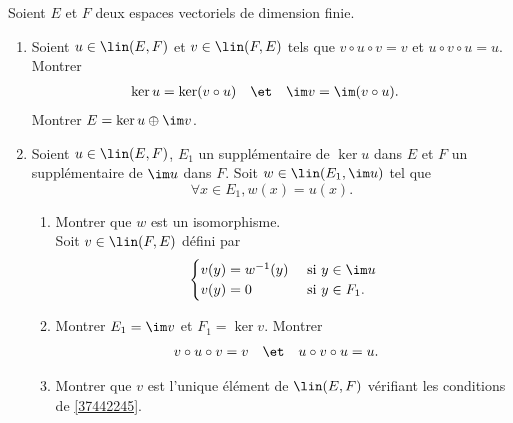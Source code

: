 \begin{enonce}
\begin{exercise}[ID={RMS 122 E250},subtitle={},tags={}]
Soient $E$ et $F$ deux espaces vectoriels de dimension finie.
\begin{enumerate}
  \item
	Soient $u\in\lin(E,F)$ et $v\in\lin(F,E)$ tels que $v\circ u\circ v=v$ et $u\circ v\circ u=u$. Montrer
	\begin{align*}
	  \ker u&= \ker(v\circ u)&
	  &\et&
	  \im v&=\im(v\circ u).
	\end{align*}
	Montrer $E=\ker u\oplus\im v$.

  \item
	Soient $u\in\lin(E,F)$, $E_1$ un supplémentaire de $\ker u$ dans $E$ et $F$ un supplémentaire de $\im u$ dans $F$. Soit $w\in\lin(E_1,\im u)$ tel que
	\begin{equation*}
	  \forall x\in E_1, w(x)=u(x).
	\end{equation*}
	\begin{enumerate}
	  \item Montrer que $w$ est un isomorphisme.\\
		Soit $v\in\lin(F,E)$ défini par
		\begin{equation*}
		  \begin{cases}
			v(y)=w^{-1}(y) & \text{ si } y\in\im u\\
			v(y)=0 & \text{ si } y\in F_1.
		  \end{cases}
		\end{equation*}
	  \item \label{37442245}
		Montrer $E_1=\im v$ et $F_1=\ker v$. Montrer
		\begin{align*}
		  v\circ u\circ v&=v&
		  &\et&
		  u\circ v\circ u&= u.
		\end{align*}
	  \item 
		Montrer que $v$ est l'unique élément de $\lin(E,F)$ vérifiant les conditions de \ref{37442245}.
	\end{enumerate}
\end{enumerate}
\end{exercise}
\begin{solution}
\end{solution}
\end{enonce}
